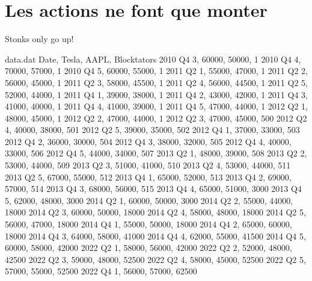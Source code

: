 \documentclass[a4paper,10pt]{article}
\begin{document}
\section{Les actions ne font que monter}
    \begin{minipage}[b]{0.5\linewidth}
        Stonks only go up!
        \newline

        \begin{filecontents*}{data.dat}
            Date,    Tesla,   AAPL,     Blocktators
            2010 Q4 3, 60000, 50000, 1
            2010 Q4 4, 70000, 57000, 1
            2010 Q4 5, 60000, 55000, 1
            2011 Q2 1, 55000, 47000, 1
            2011 Q2 2, 56000, 45000, 1
            2011 Q2 3, 58000, 45500, 1
            2011 Q2 4, 56000, 44500, 1
            2011 Q2 5, 52000, 44000, 1
            2011 Q4 1, 39000, 38000, 1
            2011 Q4 2, 43000, 42000, 1
            2011 Q4 3, 41000, 40000, 1
            2011 Q4 4, 41000, 39000, 1
            2011 Q4 5, 47000, 44000, 1
            2012 Q2 1, 48000, 45000, 1
            2012 Q2 2, 47000, 44000, 1
            2012 Q2 3, 47000, 45000, 500
            2012 Q2 4, 40000, 38000, 501
            2012 Q2 5, 39000, 35000, 502
            2012 Q4 1, 37000, 33000, 503
            2012 Q4 2, 36000, 30000, 504
            2012 Q4 3, 38000, 32000, 505
            2012 Q4 4, 40000, 33000, 506
            2012 Q4 5, 44000, 34000, 507
            2013 Q2 1, 48000, 39000, 508
            2013 Q2 2, 53000, 44000, 509
            2013 Q2 3, 51000, 41000, 510
            2013 Q2 4, 53000, 44000, 511
            2013 Q2 5, 67000, 55000, 512
            2013 Q4 1, 65000, 52000, 513
            2013 Q4 2, 69000, 57000, 514
            2013 Q4 3, 68000, 56000, 515
            2013 Q4 4, 65000, 51000, 3000
            2013 Q4 5, 62000, 48000, 3000
            2014 Q2 1, 60000, 50000, 3000
            2014 Q2 2, 55000, 44000, 18000
            2014 Q2 3, 60000, 50000, 18000
            2014 Q2 4, 58000, 48000, 18000
            2014 Q2 5, 56000, 47000, 18000
            2014 Q4 1, 55000, 50000, 18000
            2014 Q4 2, 65000, 60000, 18000
            2014 Q4 3, 64000, 58000, 41000
            2014 Q4 4, 62000, 55000, 41500
            2014 Q4 5, 60000, 58000, 42000
            2022 Q2 1, 58000, 56000, 42000
            2022 Q2 2, 52000, 48000, 42500
            2022 Q2 3, 59000, 48000, 52500
            2022 Q2 4, 58000, 45000, 52500
            2022 Q2 5, 57000, 55000, 52500
            2022 Q4 1, 56000, 57000, 62500
            \end{filecontents*}


\end{minipage}
\end{document}
